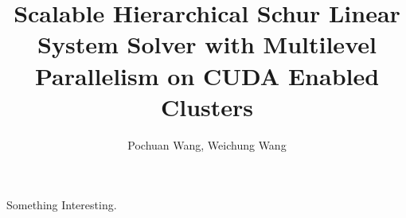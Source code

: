 \documentclass{beamer}
\title{Scalable Hierarchical Schur Linear System Solver with Multilevel Parallelism on CUDA Enabled Clusters}
\author{Pochuan Wang, Weichung Wang}
\begin{document}
  Something Interesting.
\end{document}
